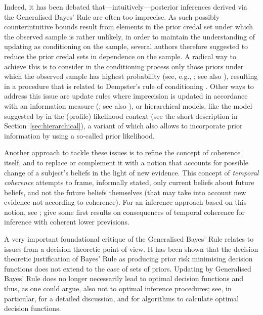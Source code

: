 Indeed, it has been debated that---intuitively---posterior inferences derived via the Generalised Bayes' Rule are often too imprecise.
As such possibly counterintuitive bounds result from elements in the prior credal set under which the observed sample is rather unlikely,
in order to maintain the understanding of updating as conditioning on the sample,
several authors therefore suggested to reduce the prior credal sets in dependence on the sample.
A radical way to achieve this is to consider in the conditioning process only those priors
under which the observed sample has highest probability (see, e.g., \cite{2007:held}; see also \cite{1982:walley}),
resulting in a procedure that is related to Dempster's rule of conditioning \parencite[see, e.g.,][\S 3.2]{itip-other}.
Other ways to address this issue are update rules where imprecision is updated in accordance with an information measure 
(\cite{1993:coolen, 1994:coolen}; see also \cite{1994:coolen::phd}), or hierarchical models,
like the model suggested by \textcite{2008:cattaneo} in the (profile) likelihood context
(see the short description in Section~\ref{sec:hierarchical}),
a variant of which also allows to incorporate prior information by using a so-called prior likelihood.

Another approach to tackle these issues is to refine the concept of coherence itself,
and to replace or complement it with a notion that accounts for possible change of a subject's beliefs
in the light of new evidence. This concept of \emph{temporal coherence} \parencite{1985:goldstein::temporal}
attempts to frame, informally stated, only current beliefs about future beliefs,
and not the future beliefs themselves (that may take into account new evidence not according to coherence).
For an inference approach based on this notion, see
\textcite{2007:goldstein:wooff::bayeslinear}; 
\textcite{2013:troffaes:goldstein} give some first results on consequences of temporal coherence
for inference with coherent lower previsions.

A very important foundational critique of the Generalised Bayes' Rule relates to issues from a decision theoretic point of view.
It has been shown that the decision theoretic justification of Bayes' Rule
as producing prior risk minimising decision functions does not extend to the case of sets of priors.
Updating by Generalised Bayes' Rule does no longer necessarily lead to optimal decision functions and thus, as one could argue,
also not to optimal inference procedures; see, in particular, \textcite{2003:augustin} for a detailed discussion, 
\textcite{2001:NoubiapSeidel} and \textcite{Augustin5:2004} for algorithms to calculate optimal decision functions.

